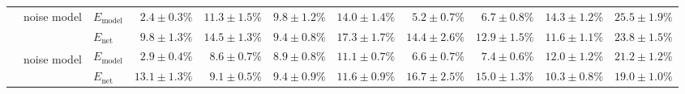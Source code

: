 \begin{sidewaystable}
\begin{tabular}{p{2.2cm} p{1.7cm} l r r r r r r r r }
	\\\cmidrule(l){2-11}
	&
	\multirow{2}{1.7cm}{\raggedleft %
	noise model} &
	$E_\mathrm{model}$ & 
	\color{Gray}$2.4 \pm 0.3\%$ & \color{Gray}$11.3 \pm 1.5\%$ & \color{Gray}$9.8 \pm 1.2\%$ & \color{Gray}$14.0 \pm 1.4\%$ & \color{Gray}$5.2 \pm 0.7\%$ & \color{Gray}$6.7 \pm 0.8\%$ & \color{Gray}$14.3 \pm 1.2\%$ & \color{Gray}$25.5 \pm 1.9\%$
	\\
	& & 
	$E_\mathrm{net}$ &
	\cellcolor{White!25!SteelBlue}$9.8 \pm 1.3\%$ & \cellcolor{White!19!SteelBlue}$14.5 \pm 1.3\%$ & \cellcolor{White!32!SteelBlue}$9.4 \pm 0.8\%$ & \cellcolor{White!13!SteelBlue}$17.3 \pm 1.7\%$ & \cellcolor{White!32!SteelBlue}$14.4 \pm 2.6\%$ & \cellcolor{White!19!SteelBlue}$12.9 \pm 1.5\%$ & \cellcolor{White!25!SteelBlue}$11.6 \pm 1.1\%$ & \cellcolor{White!13!SteelBlue}$23.8 \pm 1.5\%$
	\\\cmidrule(l){2-11}
	&
	\multirow{2}{1.7cm}{\raggedleft %
	noise model\textsuperscript{\dag}} &
	$E_\mathrm{model}$ & 
	\color{Gray}$2.9 \pm 0.4\%$ & \color{Gray}$8.6 \pm 0.7\%$ & \color{Gray}$8.9 \pm 0.8\%$ & \color{Gray}$11.1 \pm 0.7\%$ & \color{Gray}$6.6 \pm 0.7\%$ & \color{Gray}$7.4 \pm 0.6\%$ & \color{Gray}$12.0 \pm 1.2\%$ & \color{Gray}$21.2 \pm 1.2\%$
	\\
	& & 
	$E_\mathrm{net}$ &
	\cellcolor{White!7!SteelBlue}$13.1 \pm 1.3\%$ & \cellcolor{White!25!SteelBlue}$9.1 \pm 0.5\%$ & \cellcolor{White!38!SteelBlue}$9.4 \pm 0.9\%$ & \cellcolor{White!25!SteelBlue}$11.6 \pm 0.9\%$ & \cellcolor{White!7!SteelBlue}$16.7 \pm 2.5\%$ & \cellcolor{White!13!SteelBlue}$15.0 \pm 1.3\%$ & \cellcolor{White!44!SteelBlue}$10.3 \pm 0.8\%$ & \cellcolor{White!25!SteelBlue}$19.0 \pm 1.0\%$
	\\
	\bottomrule
	\end{tabular}
\end{sidewaystable}

